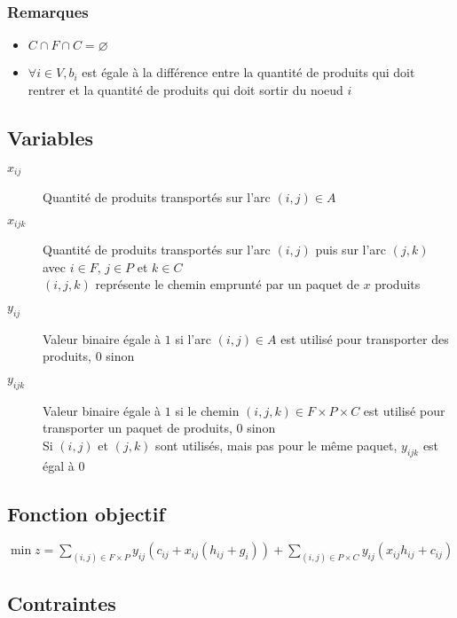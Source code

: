 \documentclass[a4paper,12pt]{article}
\begin{document}
\subsubsection{Remarques}

\begin{itemize}
 \item $C\cap F\cap C = \varnothing$
 \item $\forall i \in V, b_i$ est égale à la différence entre la quantité de produits qui doit rentrer et la quantité de produits qui doit sortir du noeud $i$
\end{itemize}


\subsection{Variables}

\begin{description}
 \item[$x_{ij}$] Quantité de produits transportés sur l'arc $(i,j) \in A$
 \item[$x_{ijk}$] Quantité de produits transportés sur l'arc $(i,j)$ puis sur l'arc $(j,k)$ avec $i \in F$, $j \in P$ et $k \in C$ \\
 $(i,j,k)$ représente le chemin emprunté par un paquet de $x$ produits
 \item[$y_{ij}$] Valeur binaire égale à  $1$ si l'arc $(i,j) \in A$ est utilisé pour transporter des produits, $0$ sinon
 \item[$y_{ijk}$] Valeur binaire égale à  $1$ si le chemin $(i,j,k) \in F\times P \times C$ est utilisé pour transporter un paquet de produits, $0$ sinon \\
 Si $(i,j)$ et $(j,k)$ sont utilisés, mais pas pour le même paquet, $y_{ijk}$ est égal à $0$
\end{description}

\subsection{Fonction objectif}

$\min z = \sum \limits_{(i,j) \in F\times P} y_{ij} ( c_{ij} + x_{ij} (h_{ij} + g_i)) + \sum \limits_{(i,j) \in P \times C} y_{ij} (x_{ij} h _{ij}  + c_{ij})$

\subsection{Contraintes}
\end{document}
